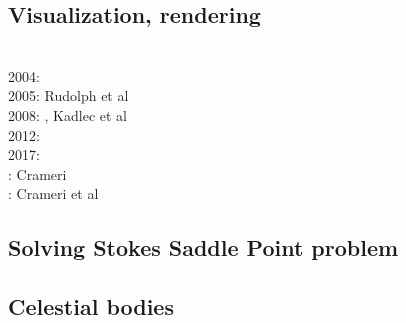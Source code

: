 \subsection{Visualization, rendering}

\begin{scriptsize}
\cite{faha}\\
2004: \cite{rugy04}\\
2005: Rudolph et al \cite{rugy05}\\
2008: \cite{chzy08}\cite{stmt08}\cite{bikh08}, Kadlec et al \cite{kadt08}\\
2012: \cite{may12}\\
2017: \cite{krke17}\\
\twothousandeighteen: Crameri \cite{cram18}\\
\twothousandtwenty: Crameri et al \cite{crsh20}
\end{scriptsize}

\subsection{Solving Stokes Saddle Point problem}

\begin{scriptsize}
\cite{laqu86}
\cite{rotf90}
\cite{frha93}
\cite{elgo94}
\cite{cheb96}\cite{elma96}
\cite{brpv97}
\cite{lixu01}
\cite{dogs06}\cite{lica06}
\cite{hoow17}
\end{scriptsize}

\subsection{Celestial bodies}

